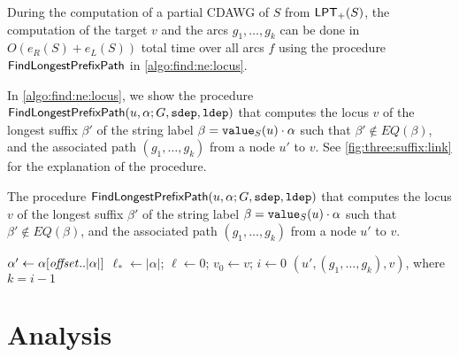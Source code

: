 \begin{lemma}\label{lem:find:ne:locus}
  During the computation of a partial CDAWG of $S$ from $\mathsf{LPT}_{+}(S)$, 
  the computation of the target $v$ and the arcs $g_1, \dots, g_k$ can be done in $O(e_R(S)+e_L(S))$ total time over all arcs $f$ using the procedure  $\textsf{FindLongestPrefixPath}$ in \cref{algo:find:ne:locus}. 
\end{lemma}


\begin{toappendix}
In \cref{algo:find:ne:locus}, we show the procedure $\textsf{FindLongestPrefixPath}(u, \alpha; G, \mathtt{sdep}, \mathtt{ldep})$ that computes the locus $v$ of the longest suffix $\beta'$ of the string label $\beta = \mathtt{value}_{S}(u)\cdot\alpha$ such that $\beta' \not\in EQ(\beta)$, and the associated path $(g_1, \dots, g_k)$ from a node $u'$ to $v$.
See \cref{fig:three:suffix:link} for the explanation of the procedure.

\begin{algorithm}[t]
  \caption{
The procedure $\textsf{FindLongestPrefixPath}(u, \alpha; G, \mathtt{sdep}, \mathtt{ldep})$ that computes the locus $v$ of the longest suffix $\beta'$ of the string label $\beta = \mathtt{value}_{S}(u)\cdot\alpha$ such that $\beta' \not\in EQ(\beta)$, and the associated path $(g_1, \dots, g_k)$ from a node $u'$ to $v$. 
  }\label{algo:find:ne:locus}
  $\alpha' \gets \alpha[\mathit{offset}..|\alpha|]$\; 
  $\ell_* \gets |\alpha|$; $\ell \gets 0$; $v_0 \gets v$; $i \gets 0$\;     
  \Return $(u', (g_1, \dots, g_k), v)$, where $k = i-1$\; 
\end{algorithm}
\end{toappendix}

\section{Analysis}
\label{sec:analysis}

